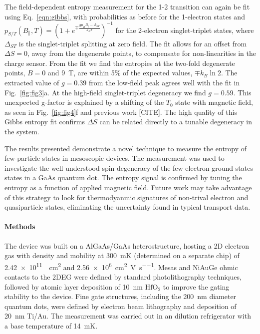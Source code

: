 \documentclass[twocolumn,showpacs,preprintnumbers,amsmath,amssymb,pra,aps,superscriptaddress]{revtex4-1}
\begin{document}
The field-dependent entropy measurement for the 1-2 transition can again be fit using Eq.~\ref{eqn:gibbs}, with probabilities as before for the 1-electron states and $p_{S/T}(B_\parallel, T) = (1+ e^{\mp \frac{g\mu_B B_\parallel - \Delta_{ST}}{k_B T}})^{-1}$ for the 2-electron singlet-triplet states, where $\Delta_{ST}$ is the singlet-triplet splitting at zero field. The fit allows for an offset from $\Delta S=0$, away from the degenerate points, to compensate for non-linearities in the charge sensor. From the fit we find the entropies at the two-fold degenerate points, $B=0$ and \SI{9}{\tesla}, are within 5\% of the expected values, $\mp k_B \ln{2}$. The extracted value of $g = 0.39$ from the low-field peak agrees well with the fit in Fig.~\ref{fig:fig3}a. At the high-field singlet-triplet degeneracy we find $g = 0.59$. This unexpected g-factor is explained by a shifting of the $T_{0}$ state with magnetic field, as seen in Fig.~\ref{fig:fig4}f and previous work [CITE]. The high quality of this Gibbs entropy fit confirms $\Delta S$ can be related directly to a tunable degeneracy in the system.

The results presented demonstrate a novel technique to measure the entropy of few-particle states in mesoscopic devices. The measurement was used to investigate the well-understood spin degeneracy of the few-electron ground states states in a GaAs quantum dot. The entropy signal is confirmed by tuning the entropy as a function of applied magnetic field. Future work may take advantage of this strategy to look for thermodyanmic signatures of non-trival electron and quasiparticle states, eliminating the uncertainty found in typical transport data.

\paragraph*{Methods} The device was built on a AlGaAs/GaAs heterostructure, hosting a 2D electron gas with density and mobility at \SI{300}{\milli\kelvin} (determined on a separate chip) of \SI{2.42e11}{\per\square\centi\metre} and \SI[per-mode=symbol]{2.56e6}{\square\centi\metre\per\volt\per\second}.   Mesas and NiAuGe ohmic contacts to the 2DEG were defined by standard photolithography techniques, followed by atomic layer deposition of \SI{10}{\nano\metre} $\mathrm{HfO_2}$ to improve the gating stability to the device. Fine gate structures, including the \SI{200}{\nano\metre} diameter quantum dots, were defined by electron beam lithography and deposition of \SI{20}{\nano\metre} Ti/Au. The measurement was carried out in an dilution refrigerator with a base temperature of \SI{14}{\milli\kelvin}.
\end{document}
